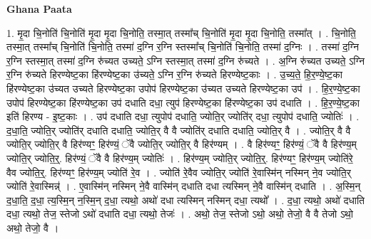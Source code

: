 \documentclass[17pt]{extarticle}
\begin{document}
\textbf{Ghana Paata } \newline

1. मृ॒दा चि॒नोति॑ चि॒नोति॑ मृ॒दा मृ॒दा चि॒नोति॒ तस्मा॒त् तस्मा᳚च् चि॒नोति॑ मृ॒दा मृ॒दा चि॒नोति॒ तस्मा᳚त् । . चि॒नोति॒ तस्मा॒त् तस्मा᳚च् चि॒नोति॑ चि॒नोति॒ तस्मा॑ द॒ग्नि र॒ग्नि स्तस्मा᳚च् चि॒नोति॑ चि॒नोति॒ तस्मा॑ द॒ग्निः । . तस्मा॑ द॒ग्नि र॒ग्नि स्तस्मा॒त् तस्मा॑ द॒ग्नि रु॑च्यत उच्यते॒ ऽग्नि स्तस्मा॒त् तस्मा॑ द॒ग्नि रु॑च्यते । . अ॒ग्नि रु॑च्यत उच्यते॒ ऽग्नि र॒ग्नि रु॑च्यते हिरण्येष्ट॒का हि॑रण्येष्ट॒का उ॑च्यते॒ ऽग्नि र॒ग्नि रु॑च्यते हिरण्येष्ट॒काः । . उ॒च्य॒ते॒ हि॒र॒ण्ये॒ष्ट॒का हि॑रण्येष्ट॒का उ॑च्यत उच्यते हिरण्येष्ट॒का उपोप॑ हिरण्येष्ट॒का उ॑च्यत उच्यते हिरण्येष्ट॒का उप॑ । . हि॒र॒ण्ये॒ष्ट॒का उपोप॑ हिरण्येष्ट॒का हि॑रण्येष्ट॒का उप॑ दधाति दधा॒ त्युप॑ हिरण्येष्ट॒का हि॑रण्येष्ट॒का उप॑ दधाति । . हि॒र॒ण्ये॒ष्ट॒का इति॑ हिरण्य - इ॒ष्ट॒काः । . उप॑ दधाति दधा॒ त्युपोप॑ दधाति॒ ज्योति॒र् ज्योति॑र् दधा॒ त्युपोप॑ दधाति॒ ज्योतिः॑ । . द॒धा॒ति॒ ज्योति॒र् ज्योति॑र् दधाति दधाति॒ ज्योति॒र् वै वै ज्योति॑र् दधाति दधाति॒ ज्योति॒र् वै । . ज्योति॒र् वै वै ज्योति॒र् ज्योति॒र् वै हिर॑ण्यꣳ॒॒ हिर॑ण्यं॒ ॅवै ज्योति॒र् ज्योति॒र् वै हिर॑ण्यम् । . वै हिर॑ण्यꣳ॒॒ हिर॑ण्यं॒ ॅवै वै हिर॑ण्य॒म् ज्योति॒र् ज्योति॒र्॒. हिर॑ण्यं॒ ॅवै वै हिर॑ण्य॒म् ज्योतिः॑ । . हिर॑ण्य॒म् ज्योति॒र् ज्योति॒र्॒. हिर॑ण्यꣳ॒॒ हिर॑ण्य॒म् ज्योति॑रे॒ वैव ज्योति॒र्॒. हिर॑ण्यꣳ॒॒ हिर॑ण्य॒म् ज्योति॑ रे॒व । . ज्योति॑ रे॒वैव ज्योति॒र् ज्योति॑ रे॒वास्मि॑न् नस्मिन् ने॒व ज्योति॒र् ज्योति॑ रे॒वास्मिन्न्॑ । . ए॒वास्मि॑न् नस्मिन् ने॒वै वास्मि॑न् दधाति दधा त्यस्मिन् ने॒वै वास्मि॑न् दधाति । . अ॒स्मि॒न् द॒धा॒ति॒ द॒धा॒ त्य॒स्मि॒न् न॒स्मि॒न् द॒धा॒ त्यथो॒ अथो॑ दधा त्यस्मिन् नस्मिन् दधा॒ त्यथो᳚ । . द॒धा॒ त्यथो॒ अथो॑ दधाति दधा॒ त्यथो॒ तेज॒ स्तेजो ऽथो॑ दधाति दधा॒ त्यथो॒ तेजः॑ । . अथो॒ तेज॒ स्तेजो ऽथो॒ अथो॒ तेजो॒ वै वै तेजो ऽथो॒ अथो॒ तेजो॒ वै । \newline
\end{document}
